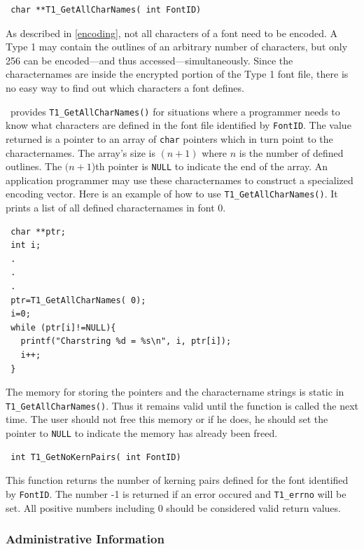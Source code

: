 \precorr
\begin{verbatim}
 char **T1_GetAllCharNames( int FontID)
\end{verbatim}\postcorr
As described in \ref{encoding}, not all characters of a font need to be
encoded. A Type 1 may contain the outlines of an arbitrary number of
characters, but only 256 can be encoded---and thus
accessed---simultaneously. Since the characternames are inside the encrypted
portion of 
the Type 1 font file, there is no easy way to find out which characters a font
defines. 

\tonelib\ provides \verb+T1_GetAllCharNames()+ for situations where a
programmer needs to know what characters are defined in the font file
identified by \verb+FontID+. The value returned is a pointer to an array of
\verb+char+ pointers which in turn point to the characternames.
The array's size is $(n+1)$ where $n$ is the number of defined outlines. The
$(n+1$)th pointer is \verb+NULL+ to indicate the end of the array.
An application programmer may use these characternames to construct a
specialized encoding vector. Here is an example of how to use
\verb+T1_GetAllCharNames()+. It prints a list of all defined characternames in
font 0.
\begin{verbatim}
 char **ptr;
 int i;
 .
 .
 .
 ptr=T1_GetAllCharNames( 0);
 i=0;
 while (ptr[i]!=NULL){
   printf("Charstring %d = %s\n", i, ptr[i]);
   i++;
 }
\end{verbatim}

The memory for storing the pointers and the charactername strings is static in\\
\verb+T1_GetAllCharNames()+. Thus it remains valid until the function is
called the next time. The user should not free this memory or if he does, he
should set the pointer to \verb+NULL+ to indicate the memory has already been
freed. 

\precorr
\begin{verbatim}
 int T1_GetNoKernPairs( int FontID)
\end{verbatim}\postcorr
This function returns the number of kerning pairs defined for the font
identified by \verb+FontID+. The number -1 is returned if an error occured and
\verb+T1_errno+ will be set. All positive numbers including 0 should be
considered valid return values.


\subsubsection{Administrative Information}
\label{administrativeinformation}%


